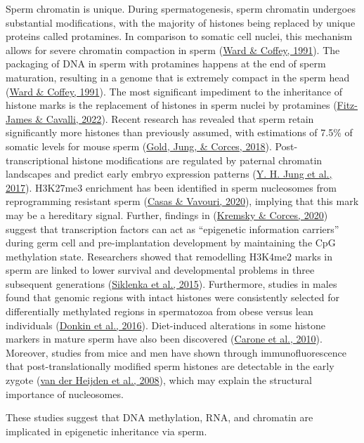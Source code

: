 \documentclass[12pt,twoside]{reedthesis}
\begin{document}
Sperm chromatin is unique. During spermatogenesis, sperm chromatin
undergoes substantial modifications, with the majority of histones being
replaced by unique proteins called protamines. In comparison to somatic
cell nuclei, this mechanism allows for severe chromatin compaction in
sperm (\protect\hyperlink{ref-ward1991}{Ward \& Coffey, 1991}). The packaging of DNA in sperm with protamines happens
at the end of sperm maturation, resulting in a genome that is extremely
compact in the sperm head (\protect\hyperlink{ref-ward1991}{Ward \& Coffey, 1991}). The most significant impediment
to the inheritance of histone marks is the replacement of histones in
sperm nuclei by protamines (\protect\hyperlink{ref-fitz-james2022}{Fitz-James \& Cavalli, 2022}). Recent research has
revealed that sperm retain significantly more histones than previously
assumed, with estimations of 7.5\% of somatic levels for mouse sperm
(\protect\hyperlink{ref-gold2018}{Gold, Jung, \& Corces, 2018}). Post-transcriptional histone modifications are regulated by
paternal chromatin landscapes and predict early embryo expression
patterns (\protect\hyperlink{ref-jung2017}{Y. H. Jung et al., 2017}). H3K27me3 enrichment has been identified in sperm
nucleosomes from reprogramming resistant sperm (\protect\hyperlink{ref-casas2020}{Casas \& Vavouri, 2020}), implying
that this mark may be a hereditary signal. Further, findings in
(\protect\hyperlink{ref-kremsky2020}{Kremsky \& Corces, 2020}) suggest that transcription factors can act as ``epigenetic
information carriers'' during germ cell and pre-implantation development
by maintaining the CpG methylation state. Researchers showed that
remodelling H3K4me2 marks in sperm are linked to lower survival and
developmental problems in three subsequent generations (\protect\hyperlink{ref-siklenka2015}{Siklenka et al., 2015}).
Furthermore, studies in males found that genomic regions with intact
histones were consistently selected for differentially methylated
regions in spermatozoa from obese versus lean individuals (\protect\hyperlink{ref-donkin2016}{Donkin et al., 2016}).
Diet-induced alterations in some histone markers in mature sperm have
also been discovered (\protect\hyperlink{ref-carone2010}{Carone et al., 2010}). Moreover, studies from mice and men
have shown through immunofluorescence that post-translationally modified
sperm histones are detectable in the early zygote (\protect\hyperlink{ref-vanderheijden2008}{van der Heijden et al., 2008}),
which may explain the structural importance of nucleosomes.

These studies suggest that DNA methylation, RNA, and chromatin are
implicated in epigenetic inheritance via sperm.
\end{document}
